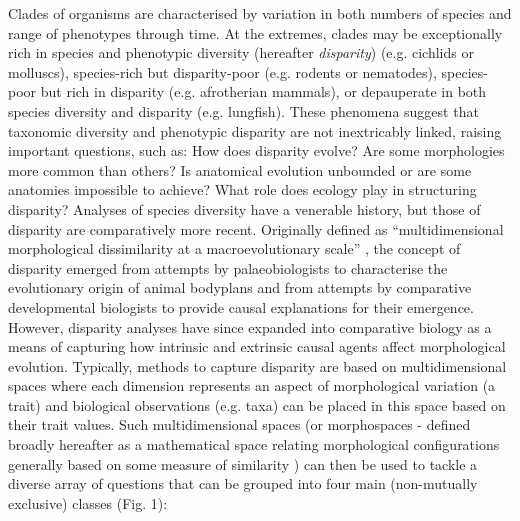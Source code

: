 \documentclass[12pt,letterpaper]{article}
\begin{document}
\noindent Clades of organisms are characterised by variation in both numbers of species and range of phenotypes through time.
At the extremes, clades may be exceptionally rich in species and phenotypic diversity (hereafter \textit{disparity}) (e.g. cichlids or molluscs), species-rich but disparity-poor (e.g. rodents or nematodes), species-poor but rich in disparity (e.g. afrotherian mammals), or depauperate in both species diversity and disparity (e.g. lungfish).
These phenomena suggest that taxonomic diversity and phenotypic disparity are not inextricably linked, raising important questions, such as: How does disparity evolve? Are some morphologies more common than others? Is anatomical evolution unbounded or are some anatomies impossible to achieve? What role does ecology play in structuring disparity? Analyses of species diversity have a venerable history, but those of disparity are comparatively more recent.
Originally defined as ``multidimensional morphological dissimilarity at a macroevolutionary scale'' \citep{runnegar1987rates,Gould1991}, the concept of disparity emerged from attempts by palaeobiologists to characterise the evolutionary origin of animal bodyplans and from attempts by comparative developmental biologists to provide causal explanations for their emergence.
However, disparity analyses have since expanded into comparative biology as a means of capturing how intrinsic and extrinsic causal agents affect morphological evolution.
Typically, methods to capture disparity are based on multidimensional spaces where each dimension represents an aspect of morphological variation (a trait) and biological observations (e.g. taxa) can be placed in this space based on their trait values.
Such multidimensional spaces (or morphospaces - defined broadly hereafter as a mathematical space relating morphological configurations generally based on some measure of similarity \citep{mitteroecker2009concept}) can then be used to tackle a diverse array of questions that can be grouped into four main (non-mutually exclusive) classes (Fig. 1): %
\end{document}
